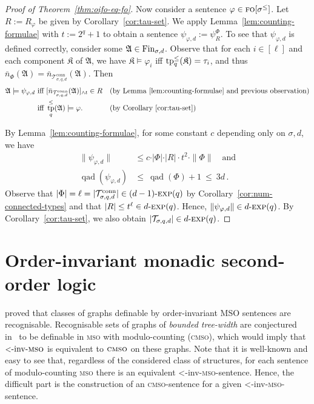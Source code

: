 \documentclass[11pt]{article}
\renewcommand{\phi}{\varphi}
\newcommand{\fin}{\textup{Fin}}
\newcommand{\conn}{\text{conn}}
\newcommand{\logic}[1]{\textsc{#1}}
\newcommand{\FO}{\logic{fo}}
\newcommand{\MSO}{\logic{mso}}
\newcommand{\CMSO}{\logic{cmso}}
\newcommand{\ordinv}[1]{\textnormal{{\small \textless}-inv-}#1}
\newcommand{\oiMSO}{\ordinv{\MSO{}}}
\newcommand{\types}[1][\sigma,q,d]{\mathcal{T}_{#1}}
\newcommand{\ctypes}[1][\sigma,q,d]{\mathcal{T}^{\conn}_{#1}}
\newcommand{\redmax}[2]{[#1]_{{\wedge}#2}}
\newcommand{\size}[1]{\|#1\|}
\newcommand{\qad}[1]{\operatorname{qad}(#1)}
\newcommand{\absval}[1]{\vert #1 \vert}
\newcommand{\leqsym}{\logic{\ensuremath{\leq}}}
\DeclareMathOperator{\tp}{tp}
\newcommand{\struct}[1]{\mathfrak{#1}}
\newcommand{\AS}{\struct{A}}
\newcommand{\KS}{\struct{K}}
\newcommand{\nexp}[1][d]{\ensuremath{#1\textnormal{-}\textsc{exp}}}
\begin{document}
\begin{proof}[Proof of Theorem~\ref{thm:oifo-eq-fo}]
  Now consider a sentence $\phi\in\FO[\sigma^{\leq}]$.  Let
  $R:=R_\phi$ be given by Corollary~\ref{cor:tau-set}. We apply
  Lemma~\ref{lem:counting-formulae} with $t:=2^{q}+1$ to obtain a
  sentence $\psi_{\phi,d}:=\psi^{\Phi}_{R}$.  To see that
  $\psi_{\phi,d}$ is defined correctly, consider some $\AS\in
  \fin_{\sigma,d}$.  Observe that for each $i\in [\ell]$ and each
  component $\KS$ of $\AS$, we have $\KS \models \phi_{i}$ iff
  $\tp^\leqsym_q(\KS)=\tau_i$, and thus $\bar n_{\Phi}(\AS)=\bar
  n_{\ctypes[\sigma,q,d]}(\AS)$.  Then
  \begin{align*}
  \AS \models \psi_{\phi,d}
  &
  \text{ iff }
  \redmax{\bar n_{\ctypes[\sigma,q,d]}(\AS)}{t}\in R
  &&
  \text{(by Lemma~\ref{lem:counting-formulae} and previous observation)}
  \\
  &
  \text{ iff }
  \tp^\leqsym_q(\AS)\models \phi.
  &&
  \text{(by Corollary~\ref{cor:tau-set})}
  \end{align*}
  
  By Lemma~\ref{lem:counting-formulae}, for some constant $c$ depending only on $\sigma,d$, we
  have
  \[
  \begin{split}
    \size{\psi_{\phi,d}} &\leq c \cdot \absval{\Phi} \cdot \absval{R} \cdot t^2 \cdot \size{\Phi}
    \quad\text{and}
    \\
    \qad{\psi_{\phi,d}} &\leq \ \qad{\Phi} + 1 \ \leq \ 3d\, .
  \end{split}
  \]
  Observe that $\absval{\Phi} = \ell = \absval{\ctypes} \in
  \nexp[(d-1)](q)$ by Corollary~\ref{cor:num-connected-types} and that
  $\absval{R} \leq t^{\ell} \in \nexp[d](q)$. Hence,
  $\size{\psi_{\phi,d}} \in \nexp[d](q)$.
  By Corollary~\ref{cor:tau-set}, we also obtain
  $\absval{\types}\in \nexp[d](q)$.
\end{proof}

\section{Order-invariant monadic second-order logic}
\label{sec:oimso}

\cite[Thm.~4.1]{Courcelle1996} proved that classes of graphs
definable by order-invariant MSO sentences are recognisable. Recognisable sets
of graphs of \emph{bounded tree-width} are conjectured in~\cite[Conjecture
1]{Courcelle1991} to be definable in \MSO{} with modulo-counting (\CMSO{}),
which would imply that $\oiMSO{}$ is equivalent to $\CMSO$ on these graphs. Note
that it is well-known and easy to see that, regardless of the considered class
of structures, for each sentence of modulo-counting \MSO{} there is an
equivalent \oiMSO{}-sentence. Hence, the difficult part is the construction of
an \CMSO{}-sentence for a given \oiMSO{}-sentence.
\end{document}

